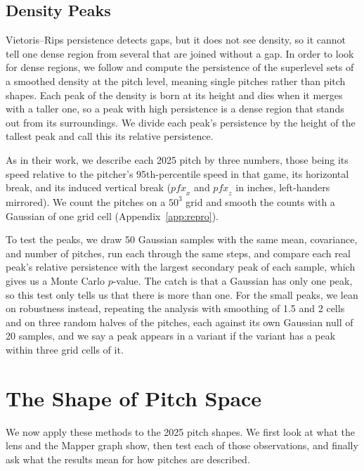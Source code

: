 \documentclass[11pt]{article}
\theoremstyle{definition}
\theoremstyle{remark}
\begin{document}
\FloatBarrier
\subsection{Density Peaks}\label{sec:peaks}
Vietoris--Rips persistence detects gaps, but it does not see density, so it cannot tell one dense region from several that are joined without a gap.
In order to look for dense regions, we follow \textcite{maloof2026classify} and compute the persistence of the superlevel sets of a smoothed density at the pitch level, meaning single pitches rather than pitch shapes.
Each peak of the density is born at its height and dies when it merges with a taller one, so a peak with high persistence is a dense region that stands out from its surroundings.
We divide each peak's persistence by the height of the tallest peak and call this its relative persistence.

As in their work, we describe each 2025 pitch by three numbers, those being its speed relative to the pitcher's 95th-percentile speed in that game, its horizontal break, and its induced vertical break ($\mathit{pfx}_x$ and $\mathit{pfx}_z$ in inches, left-handers mirrored).
We count the pitches on a $50^3$ grid and smooth the counts with a Gaussian of one grid cell (Appendix~\ref{app:repro}).

To test the peaks, we draw 50 Gaussian samples with the same mean, covariance, and number of pitches, run each through the same steps, and compare each real peak's relative persistence with the largest secondary peak of each sample, which gives us a Monte Carlo $p$-value.
The catch is that a Gaussian has only one peak, so this test only tells us that there is more than one.
For the small peaks, we lean on robustness instead, repeating the analysis with smoothing of 1.5 and 2 cells and on three random halves of the pitches, each against its own Gaussian null of 20 samples, and we say a peak appears in a variant if the variant has a peak within three grid cells of it.

\section{The Shape of Pitch Space}\label{sec:shape}
We now apply these methods to the 2025 pitch shapes. We first look at what the lens and the Mapper graph show, then test each of those observations, and finally ask what the results mean for how pitches are described.
\end{document}
